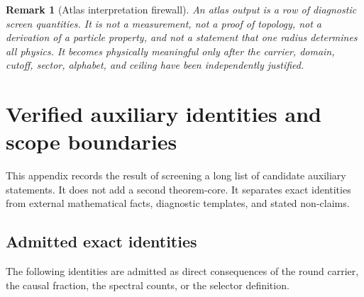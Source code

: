 \documentclass[11pt,a4paper]{article}
\newtheorem{remark}[theorem]{Remark}
\begin{document}
\begin{remark}[Atlas interpretation firewall]
An atlas output is a row of diagnostic screen quantities.  It is not a measurement, not a proof of topology, not a derivation of a particle property, and not a statement that one radius determines all physics.  It becomes physically meaningful only after the carrier, domain, cutoff, sector, alphabet, and ceiling have been independently justified.
\end{remark}



\section{Verified auxiliary identities and scope boundaries}
\label{app:verified-auxiliary-identities}

This appendix records the result of screening a long list of candidate auxiliary statements.  It does not add a second theorem-core.  It separates exact identities from external mathematical facts, diagnostic templates, and stated non-claims.

\subsection{Admitted exact identities}

The following identities are admitted as direct consequences of the round carrier, the causal fraction, the spectral counts, or the selector definition.
\end{document}
